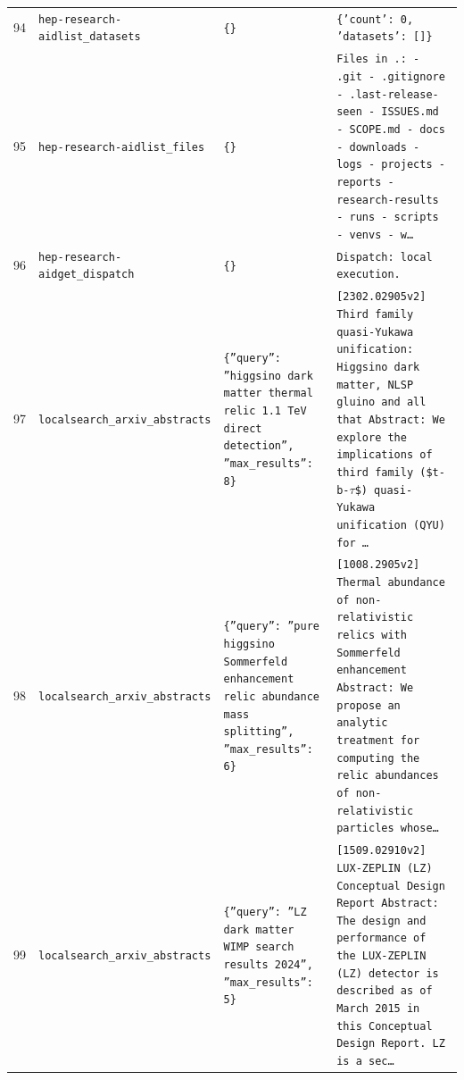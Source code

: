 \documentclass[11pt,a4paper]{article}
\begin{document}
\begin{longtable}{@{}p{}p{}p{}p{}@{}}
94 & \texttt{hep-research-aid}\newline\texttt{list\_\allowbreak{}datasets} & \texttt{\{\}\allowbreak{}} & \texttt{\{'count':\allowbreak{} 0,\allowbreak{} 'datasets':\allowbreak{} []\allowbreak{}\}\allowbreak{}} \\
95 & \texttt{hep-research-aid}\newline\texttt{list\_\allowbreak{}files} & \texttt{\{\}\allowbreak{}} & \texttt{Files in .:\allowbreak{}   - .git   - .gitignore   - .last-release-seen   - ISSUES.md   - SCOPE.md   - docs   - downloads   - logs   - projects   - reports   - research-results   - runs   - scripts   - venvs   - w\ldots{}\allowbreak{}} \\
96 & \texttt{hep-research-aid}\newline\texttt{get\_\allowbreak{}dispatch} & \texttt{\{\}\allowbreak{}} & \texttt{Dispatch:\allowbreak{} local execution.} \\
97 & \texttt{local}\newline\texttt{search\_\allowbreak{}arxiv\_\allowbreak{}abstracts} & \texttt{\{''query'':\allowbreak{} ''higgsino dark matter thermal relic 1.1 TeV direct detection'',\allowbreak{} ''max\_\allowbreak{}results'':\allowbreak{} 8\}\allowbreak{}} & \texttt{[2302.02905v2]\allowbreak{} Third family quasi-Yukawa unification:\allowbreak{} Higgsino dark matter,\allowbreak{} NLSP gluino and all that Abstract:\allowbreak{} We explore the implications of third family (\$t-b-$\tau$\$)\allowbreak{} quasi-Yukawa unification (QYU)\allowbreak{} for \ldots{}\allowbreak{}} \\
98 & \texttt{local}\newline\texttt{search\_\allowbreak{}arxiv\_\allowbreak{}abstracts} & \texttt{\{''query'':\allowbreak{} ''pure higgsino Sommerfeld enhancement relic abundance mass splitting'',\allowbreak{} ''max\_\allowbreak{}results'':\allowbreak{} 6\}\allowbreak{}} & \texttt{[1008.2905v2]\allowbreak{} Thermal abundance of non-relativistic relics with Sommerfeld enhancement Abstract:\allowbreak{} We propose an analytic treatment for computing the relic abundances of non-relativistic particles whose\ldots{}\allowbreak{}} \\
99 & \texttt{local}\newline\texttt{search\_\allowbreak{}arxiv\_\allowbreak{}abstracts} & \texttt{\{''query'':\allowbreak{} ''LZ dark matter WIMP search results 2024'',\allowbreak{} ''max\_\allowbreak{}results'':\allowbreak{} 5\}\allowbreak{}} & \texttt{[1509.02910v2]\allowbreak{} LUX-ZEPLIN (LZ)\allowbreak{} Conceptual Design Report Abstract:\allowbreak{} The design and performance of the LUX-ZEPLIN (LZ)\allowbreak{} detector is described as of March 2015 in this Conceptual Design Report. LZ is a sec\ldots{}\allowbreak{}} \\

\end{longtable}
\end{document}
